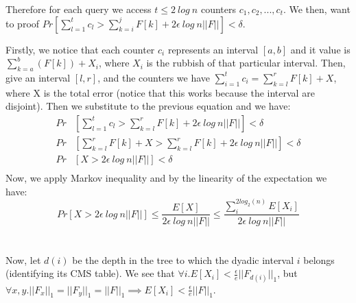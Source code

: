 \documentclass[a4paper]{article}
\begin{document}

Therefore for each query we access $t \leq 2\ log\ n$ counters $c_1,c_2,...,c_t$. We then, want to proof $Pr[\sum^t_{l=1}c_l > \sum^j_{k=i}F[k] + 2\epsilon\ log\ n ||F||]<\delta$.

Firstly, we notice that each counter $c_i$ represents an interval $[a,b]$ and it value is $\sum_{k=a}^b (F[k]) + X_i$, where $X_i$ is the rubbish of that particular interval. Then, give an interval $[l,r]$, and the counters we have $\sum^t_{i=1}c_i = \sum^r_{k=l}F[k] +X $, where X is the total error (notice that this works because the interval are disjoint). Then we substitute to the previous equation and we have:
\begin{align*}
Pr &[\sum^t_{l=1}c_l > \sum^r_{k=l}F[k] + 2\epsilon\ log\ n ||F||]<\delta \\
Pr &[ \sum^r_{k=l}F[k] +X  > \sum^r_{k=l}F[k] + 2\epsilon\ log\ n ||F||]<\delta \\
Pr &[ X  >  2\epsilon\ log\ n ||F||]<\delta \\
\end{align*}
Now, we apply Markov inequality and by the linearity of the expectation we have: $$Pr [ X  >  2\epsilon\ log\ n ||F||] \leq \frac{E[X]}{2\epsilon\ log\ n ||F||} \leq \frac{\sum_{i}^{2log_2(n)} E[X_i]}{2\epsilon\ log\ n ||F||}$$
\\
\\
Now, let $d(i)$ be the depth in the tree to which the dyadic interval $i$ belongs (identifying its CMS table). We see that $\forall i.E[X_i]< \frac{\epsilon}{e}||F_{d(i)}||_1$, but $\forall  x, y.||F_x||_1 = ||F_y||_1 = ||F||_1 \implies E[X_i]< \frac{\epsilon}{e}||F||_1$.
\end{document}
